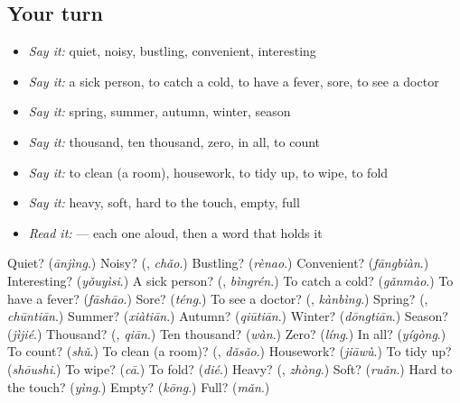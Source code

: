 \subsection*{Your turn}
\begin{itemize}
\raggedright
  \item \emph{Say it:} quiet, noisy, bustling, convenient, interesting
  \item \emph{Say it:} a sick person, to catch a cold, to have a fever, sore, to see a doctor
  \item \emph{Say it:} spring, summer, autumn, winter, season
  \item \emph{Say it:} thousand, ten thousand, zero, in all, to count
  \item \emph{Say it:} to clean (a room), housework, to tidy up, to wipe, to fold
  \item \emph{Say it:} heavy, soft, hard to the touch, empty, full
  \item \emph{Read it:}       — each one aloud, then a word that holds it
\end{itemize}

\begin{tcolorbox}[breakable,colback=teal!4,colframe=teal!35!black,title={Before you move on}]
Quiet? (\emph{ānjìng}.) Noisy? (\textbf{}, \emph{chǎo}.) Bustling? (\emph{rènao}.) Convenient? (\emph{fāngbiàn}.) Interesting? (\emph{yǒuyìsi}.) A sick person? (\textbf{}, \emph{bìngrén}.) To catch a cold? (\emph{gǎnmào}.) To have a fever? (\emph{fāshāo}.) Sore? (\emph{téng}.) To see a doctor? (\textbf{}, \emph{kànbìng}.) Spring? (\textbf{}, \emph{chūntiān}.) Summer? (\emph{xiàtiān}.) Autumn? (\emph{qiūtiān}.) Winter? (\emph{dōngtiān}.) Season? (\emph{jìjié}.) Thousand? (\textbf{}, \emph{qiān}.) Ten thousand? (\emph{wàn}.) Zero? (\emph{líng}.) In all? (\emph{yígòng}.) To count? (\emph{shǔ}.) To clean (a room)? (\textbf{}, \emph{dǎsǎo}.) Housework? (\emph{jiāwù}.) To tidy up? (\emph{shōushi}.) To wipe? (\emph{cā}.) To fold? (\emph{dié}.) Heavy? (\textbf{}, \emph{zhòng}.) Soft? (\emph{ruǎn}.) Hard to the touch? (\emph{yìng}.) Empty? (\emph{kōng}.) Full? (\emph{mǎn}.)
\end{tcolorbox}
